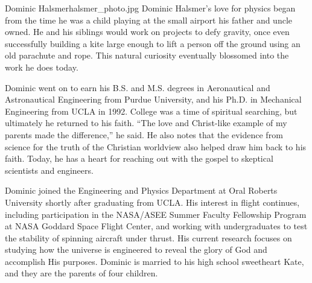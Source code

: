 \begin{authorbio}{Dominic Halsmer}{halsmer_photo.jpg}{}
Dominic Halsmer's love for physics began from the time he was a child playing at the small airport his father and uncle owned.  He and his siblings would work on projects to defy gravity, once even successfully building a kite large enough to lift a person off the ground using an old parachute and rope.  This natural curiosity eventually blossomed into the work he does today.  

Dominic went on to earn his B.S. and M.S. degrees in Aeronautical and Astronautical Engineering from Purdue University, and his Ph.D. in Mechanical Engineering from UCLA in 1992.  College was a time of spiritual searching, but ultimately he returned to his faith.  ``The love and Christ-like example of my parents made the difference,'' he said.  He also notes that the evidence from science for the truth of the Christian worldview also helped draw him back to his faith.  Today, he has a heart for reaching out with the gospel to skeptical scientists and engineers.

Dominic joined the Engineering and Physics Department at Oral Roberts University shortly after graduating from UCLA.  His interest in flight continues, including participation in the NASA/ASEE Summer Faculty Fellowship Program at NASA Goddard Space Flight Center, and working with undergraduates to test the stability of spinning aircraft under thrust.  His current research focuses on studying how the universe is engineered to reveal the glory of God and accomplish His purposes.  Dominic is married to his high school sweetheart Kate, and they are the parents of four children.


\end{authorbio}
